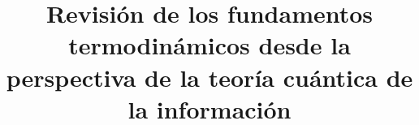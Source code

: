 \documentclass[11pt]{book}
\begin{document}









\title{Revisión de los fundamentos termodinámicos desde la perspectiva de la teoría cuántica de la información} %
\end{document}

